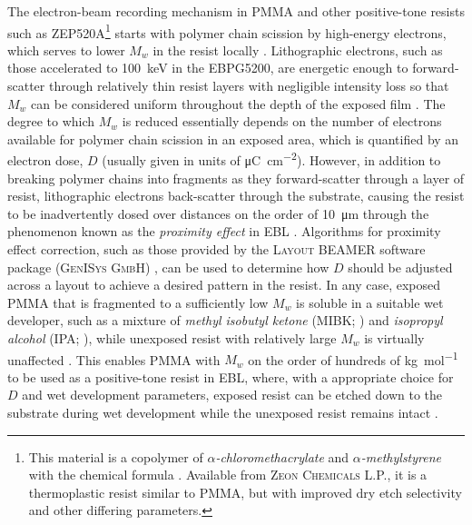The electron-beam recording mechanism in PMMA and other positive-tone resists such as ZEP520A\footnote{This material is a copolymer of \emph{$\alpha$-chloromethacrylate} and \emph{$\alpha$-methylstyrene} with the chemical formula  \cite{Czaplewski11}. Available from \textsc{Zeon Chemicals L.P.}, it is a thermoplastic resist similar to PMMA, but with improved dry etch selectivity and other differing parameters.} starts with polymer chain scission by high-energy electrons, which serves to lower $M_w$ in the resist locally \cite{Dobisz00,Greeneich75}. 
Lithographic electrons, such as those accelerated to \SI{100}{\kilo\electronvolt} in the \textsc{EBPG5200}, are energetic enough to forward-scatter through relatively thin resist layers with negligible intensity loss so that $M_w$ can be considered uniform throughout the depth of the exposed film \cite{Schleunitz10,Kirchner19}. 
The degree to which $M_w$ is reduced essentially depends on the number of electrons available for polymer chain scission in an exposed area, which is quantified by an electron dose, $D$ (usually given in units of \si{\micro\coulomb\per\cm\squared}). 
However, in addition to breaking polymer chains into fragments as they forward-scatter through a layer of resist, lithographic electrons back-scatter through the substrate, causing the resist to be inadvertently dosed over distances on the order of \SI{10}{\um} through the phenomenon known as the \emph{proximity effect} in EBL \cite{Pavkovich86,Wu10}. 
Algorithms for proximity effect correction, such as those provided by the \textsc{Layout BEAMER} software package (\textsc{GenISys GmbH}) \cite{beamer}, can be used to determine how $D$ should be adjusted across a layout to achieve a desired pattern in the resist. 
In any case, exposed PMMA that is fragmented to a sufficiently low $M_w$ is soluble in a suitable wet developer, such as a mixture of \emph{methyl isobutyl ketone} (MIBK; ) and \emph{isopropyl alcohol} (IPA; ), while unexposed resist with relatively large $M_w$ is virtually unaffected \cite{miller-chou03,Pratt75}. 
This enables PMMA with $M_w$ on the order of hundreds of \si{\kilogram\per\mole} to be used as a positive-tone resist in EBL, where, with a appropriate choice for $D$ and wet development parameters, exposed resist can be etched down to the substrate during wet development while the unexposed resist remains intact \cite{Greeneich75,Vutova01,Schift10,Kirchner19}. 

